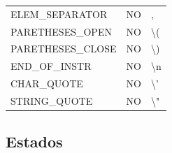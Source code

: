 \documentclass[11pt, english]{article}
\begin{document}
\begin{table}[H]
\begin{tabular}{l|l|l}
		ELEM\_SEPARATOR                                          & NO                                                                   & ,                                                                   \\
		PARETHESES\_OPEN                                         & NO                                                                   & \textbackslash{}(                                                   \\
		PARETHESES\_CLOSE                                        & NO                                                                   & \textbackslash{})                                                   \\
		END\_OF\_INSTR                                           & NO                                                                   & \textbackslash{}n                                                   \\
		CHAR\_QUOTE                                              & NO                                                                   & \textbackslash{}'                                                   \\
		STRING\_QUOTE                                            & NO                                                                   & \textbackslash{}"                                                    \\
		\bottomrule
	\end{tabular}
\end{table}

\subsection{Estados}\label{Estados}
\end{document}
